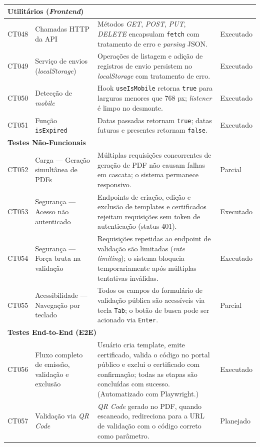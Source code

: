 \begin{longtable}{p{1.2cm} p{4.2cm} p{7.5cm} p{2.6cm}}
\midrule
\multicolumn{3}{l}{\textbf{Utilitários (\textit{Frontend})}} \\
\midrule

CT048 & Chamadas HTTP da API & Métodos \textit{GET}, \textit{POST}, \textit{PUT}, \textit{DELETE} encapsulam \texttt{fetch} com tratamento de erro e \textit{parsing} JSON. & Executado \\
CT049 & Serviço de envios (\textit{localStorage}) & Operações de listagem e adição de registros de envio persistem no \textit{localStorage} com tratamento de erro. & Executado \\
CT050 & Detecção de \textit{mobile} & Hook \texttt{useIsMobile} retorna \texttt{true} para larguras menores que 768 px; \textit{listener} é limpo no desmonte. & Executado \\
CT051 & Função \texttt{isExpired} & Datas passadas retornam \texttt{true}; datas futuras e presentes retornam \texttt{false}. & Executado \\

\midrule
\multicolumn{3}{l}{\textbf{Testes Não-Funcionais}} \\
\midrule

CT052 & Carga — Geração simultânea de PDFs & Múltiplas requisições concorrentes de geração de PDF não causam falhas em cascata; o sistema permanece responsivo. & Parcial \\
CT053 & Segurança — Acesso não autenticado & Endpoints de criação, edição e exclusão de templates e certificados rejeitam requisições sem token de autenticação (status 401). & Executado \\
CT054 & Segurança — Força bruta na validação & Requisições repetidas ao endpoint de validação são limitadas (\textit{rate limiting}); o sistema bloqueia temporariamente após múltiplas tentativas inválidas. & Executado \\
CT055 & Acessibilidade — Navegação por teclado & Todos os campos do formulário de validação pública são acessíveis via tecla \texttt{Tab}; o botão de busca pode ser acionado via \texttt{Enter}. & Parcial \\

\midrule
\multicolumn{3}{l}{\textbf{Testes End-to-End (E2E)}} \\
\midrule

CT056 & Fluxo completo de emissão, validação e exclusão & Usuário cria template, emite certificado, valida o código no portal público e exclui o certificado com confirmação; todas as etapas são concluídas com sucesso. (Automatizado com Playwright.) & Executado \\
CT057 & Validação via \textit{QR Code} & \textit{QR Code} gerado no PDF, quando escaneado, redireciona para a URL de validação com o código correto como parâmetro. & Planejado \\


\end{longtable}
